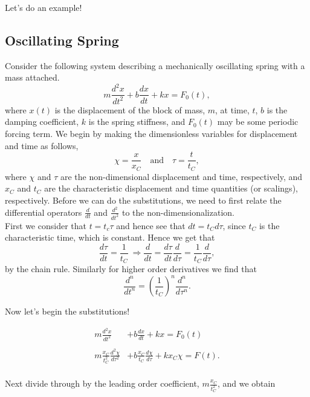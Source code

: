 Let's do an example!

%
%
%
%
\subsection{Oscillating Spring}

Consider the following system describing a mechanically oscillating spring with a mass attached.\\

$$m \frac{d^2 x}{dt^2} + b\frac{dx}{dt} + kx = F_0(t),$$
%
where $x(t)$ is the displacement of the block of mass, $m$, at time, $t$, $b$ is the damping coefficient, $k$ is the spring stiffness, and $F_0(t)$ may be some periodic forcing term. We begin by making the dimensionless variables for displacement and time as follows, \\

$$\chi = \frac{x}{x_C}  \ \ \ \mbox{ and } \ \ \  \tau = \frac{t}{t_C},$$
%
where $\chi$ and $\tau$ are the non-dimensional displacement and time, respectively, and $x_C$ and $t_C$ are the characteristic displacement and time quantities (or scalings), respectively. Before we can do the substitutions, we need to first relate the differential operators $\frac{d}{dt}$ and $\frac{d^2}{dt^2}$ to the non-dimensionalization. \\

First we consider that $t = t_c \tau$ and hence see that $dt = t_C  d\tau$, since $t_C$ is the characteristic time, which is constant. Hence we get that \\

$$\frac{d\tau}{dt} = \frac{1}{t_C} \ \Rightarrow \frac{d}{dt} = \frac{d\tau}{dt} \frac{d}{d\tau} = \frac{1}{t_C} \frac{d}{d\tau},$$
%
by the chain rule. Similarly for higher order derivatives we find that\\

$$\frac{d^n}{dt^n}  = \left(\frac{1}{t_C}\right)^n \frac{d^n}{d\tau^n}.$$

Now let's begin the substitutions!

\begin{align*}
m \frac{d^2 x}{dt^2} &+ b\frac{dx}{dt} + kx = F_0(t) \\ \\
m \frac{x_C}{t_C^2} \frac{d^2 \chi}{d\tau^2} &+ b \frac{x_C}{t_C} \frac{d\chi}{d\tau} + kx_C \chi = F(t).\\
\end{align*}

Next divide through by the leading order coefficient, $m \frac{x_C}{t_C^2}$, and we obtain


